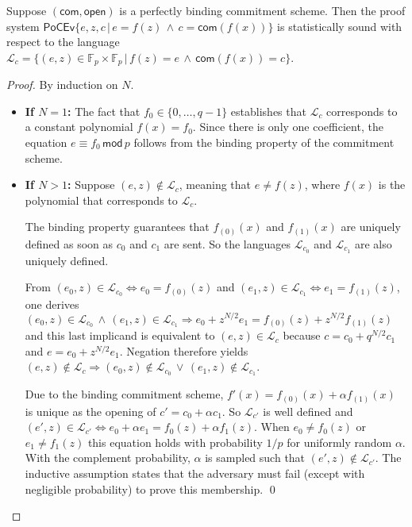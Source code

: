 \documentclass[10pt]{llncs}
\begin{document}
\begin{theorem}[soundness] \label{theorem:soundness_perfectly_binding}
Suppose $(\mathsf{com}, \mathsf{open})$ is a perfectly binding commitment scheme. Then the proof system $\mathsf{PoCEv}\{e, z, c \, | \, e = f(z) \, \wedge \, c = \mathsf{com}(f(x)) \}$ is statistically sound with respect to the language $\mathcal{L}_c = \{ ({e}, {z}) \in \mathbb{F}_p \times \mathbb{F}_p \, | \, {f}({z}) = {e} \, \wedge \, \mathsf{com}({f}(x)) = c \}$.
\end{theorem}
\begin{proof}
By induction on $N$.
\begin{itemize}
\item {\bf If $N=1$:} The fact that $f_0 \in \{0, \ldots, q-1\}$ establishes that $\mathcal{L}_c$ corresponds to a constant polynomial $f(x) = f_0$. Since there is only one coefficient, the equation $e \equiv f_0 \, \mathsf{mod} \, p$ follows from the binding property of the commitment scheme.

\item {\bf If $N>1$:} Suppose $(e, z) \not \in \mathcal{L}_c$, meaning that $e \neq f(z)$, where $f(x)$ is the polynomial that corresponds to $\mathcal{L}_c$.

The binding property guarantees that $f_{(0)}(x)$ and $f_{(1)}(x)$ are uniquely defined as soon as $c_0$ and $c_1$ are sent. So the languages $\mathcal{L}_{c_0}$ and $\mathcal{L}_{c_1}$ are also uniquely defined.

From $(e_0, z) \in \mathcal{L}_{c_0} \Leftrightarrow e_0 = f_{(0)}(z)$ and $(e_1, z) \in \mathcal{L}_{c_1} \Leftrightarrow e_1 = f_{(1)}(z)$, one derives $(e_0, z) \in \mathcal{L}_{c_0} \, \wedge \, (e_1, z) \in \mathcal{L}_{c_1} \Rightarrow e_0 + z^{N/2}e_1 = f_{(0)}(z) + z^{N/2}f_{(1)}(z)$ and this last implicand is equivalent to $(e, z) \in \mathcal{L}_c$ because $c = c_0 + q^{N/2}c_1$ and $e = e_0 + z^{N/2}e_1$. Negation therefore yields $(e, z) \not \in \mathcal{L}_c \Rightarrow (e_0, z) \not \in \mathcal{L}_{c_0} \, \vee \, (e_1, z) \not \in \mathcal{L}_{c_1}$.

Due to the binding commitment scheme, $f'(x) = f_{(0)}(x) + \alpha{}f_{(1)}(x)$ is unique as the opening of $c' = c_0 + \alpha{}c_1$. So $\mathcal{L}_{c'}$ is well defined and $(e', z) \in \mathcal{L}_{c'} \Leftrightarrow e_0 + \alpha{}e_1 = f_0(z) + \alpha{}f_1(z)$. When $e_0 \neq f_0(z)$ or $e_1 \neq f_1(z)$ this equation holds with probability $1/p$ for uniformly random $\alpha$. With the complement probability, $\alpha$ is sampled such that $(e', z) \not \in \mathcal{L}_{c'}$. The inductive assumption states that the adversary must fail (except with negligible probability) to prove this membership. \qed
\end{itemize}
\end{proof}
\end{document}
